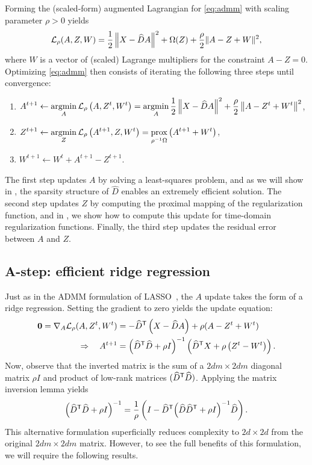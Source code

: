 \documentclass{article} %
\begin{document}
Forming the (scaled-form) augmented Lagrangian for \eqref{eq:admm} with scaling
parameter $\rho > 0 $ yields
\[
\mathcal{L}_\rho(A,Z,W) = \frac{1}{2}\left\|X - \widehat{D}A\right\|^2 + \Omega(Z) +
\frac{\rho}{2}\|A - Z + W\|^2,
\]
where $W$ is a vector of (scaled) Lagrange multipliers for the constraint $A-Z=0$.
Optimizing \eqref{eq:admm} then consists of iterating the following three steps until
convergence:
\begin{enumerate}
\item $\displaystyle A^{t+1} \leftarrow \operatorname*{argmin}_A \mathcal{L}_\rho\left(A, Z^t, W^t\right) = \operatorname*{argmin}_A \frac{1}{2}
\left\|X - \widehat{D}A\right\|^2 + \frac{\rho}{2}\left\|A - Z^t + W^t\right\|^2$,
\item $\displaystyle Z^{t+1} \leftarrow \operatorname*{argmin}_Z \mathcal{L}_\rho\left(A^{t+1}, Z, W^t\right) =
\operatorname*{prox}_{\rho^{-1}\Omega}\left(A^{t+1} + W^t \right)$,
\item $W^{t+1} \leftarrow W^t + A^{t+1} - Z^{t+1}$.
\end{enumerate}

The first step updates $A$ by solving a least-squares problem, and as we will show in
, the sparsity structure of $\widehat{D}$ enables an extremely
efficient solution.  The second step updates $Z$ by computing the proximal mapping of
the regularization function, and in , we show how to compute this
update for time-domain regularization functions.  Finally, the third step updates the
residual error between $A$ and $Z$.

\subsection{A-step: efficient ridge regression}
\label{sec:astep}
Just as in the ADMM formulation of LASSO~\cite[chapter 6.4]{boyd2011}, the $A$ update 
takes the form of a ridge regression.  Setting the gradient to zero yields the update
equation:
\begin{align}
\mathbf{0} = \nabla_A \mathcal{L}_\rho(A, Z^t, W^t) &= -\widehat{D}^\mathsf{T} \left(X - \widehat{D}A\right)
+ \rho(A - Z^t + W^t)\notag\\
\Rightarrow \quad A^{t+1} &= {\left(\widehat{D}^\mathsf{T} \widehat{D} + \rho I\right)}^{-1}
\left(\widehat{D}^\mathsf{T} X + \rho \left(Z^t - W^t\right)\right).\label{eq:a-update}
\end{align}
Now, observe that the inverted matrix is the sum of a $2dm\times 2dm$ diagonal matrix 
$\rho I$ and product of low-rank matrices $(\widehat{D}^\mathsf{T}\widehat{D})$.  
Applying the matrix inversion lemma yields
\begin{equation}
{\left(\widehat{D}\ensuremath{^\mathsf{T}}\widehat{D} + \rho I\right)}^{-1} = \frac{1}{\rho}\left( I -  \widehat{D}^\mathsf{T}
{\left(\widehat{D}\widehat{D}^\mathsf{T}  + \rho I \right)}^{-1}
\widehat{D}\right).\label{eq:inversion}
\end{equation}
This alternative formulation superficially reduces complexity to $2d\times 2d$
from the original $2dm\times 2dm$ matrix.  However, to see the full
benefits of this formulation, we will require the following results.
\end{document}
